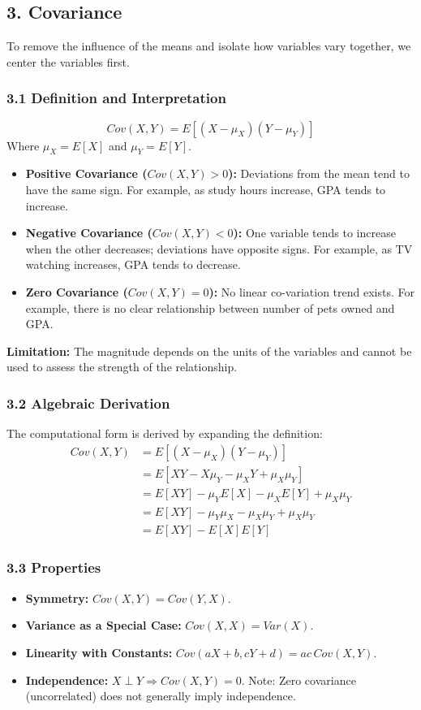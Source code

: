 \documentclass{article}
\begin{document}
\subsection*{3. Covariance}
To remove the influence of the means and isolate how variables vary together, we center the variables first.

\subsubsection*{3.1 Definition and Interpretation}
$$Cov(X,Y) = E[(X-\mu_X)(Y-\mu_Y)]$$
Where $\mu_X = E[X]$ and $\mu_Y = E[Y]$.

\begin{itemize}
    \item \textbf{Positive Covariance ($Cov(X,Y) > 0$):} Deviations from the mean tend to have the same sign. For example, as study hours increase, GPA tends to increase.
    \item \textbf{Negative Covariance ($Cov(X,Y) < 0$):} One variable tends to increase when the other decreases; deviations have opposite signs. For example, as TV watching increases, GPA tends to decrease.
    \item \textbf{Zero Covariance ($Cov(X,Y) = 0$):} No linear co-variation trend exists. For example, there is no clear relationship between number of pets owned and GPA.
\end{itemize}
\textbf{Limitation:} The magnitude depends on the units of the variables and cannot be used to assess the strength of the relationship.

\subsubsection*{3.2 Algebraic Derivation}
The computational form is derived by expanding the definition:
\begin{align*}
Cov(X,Y) &= E[(X-\mu_X)(Y-\mu_Y)] \\
&= E[XY - X\mu_{Y} - \mu_{X}Y + \mu_{X}\mu_{Y}] \\
&= E[XY] - \mu_{Y}E[X] - \mu_{X}E[Y] + \mu_{X}\mu_{Y} \\
&= E[XY] - \mu_{Y}\mu_{X} - \mu_{X}\mu_{Y} + \mu_{X}\mu_{Y} \\
&= E[XY] - E[X]E[Y]
\end{align*}

\subsubsection*{3.3 Properties}
\begin{itemize}
    \item \textbf{Symmetry:} $Cov(X,Y) = Cov(Y,X)$.
    \item \textbf{Variance as a Special Case:} $Cov(X,X) = Var(X)$.
    \item \textbf{Linearity with Constants:} $Cov(aX+b, cY+d) = ac \, Cov(X,Y)$.
    \item \textbf{Independence:} $X \perp Y \Rightarrow Cov(X,Y) = 0$. Note: Zero covariance (uncorrelated) does not generally imply independence.
\end{itemize}
\end{document}
